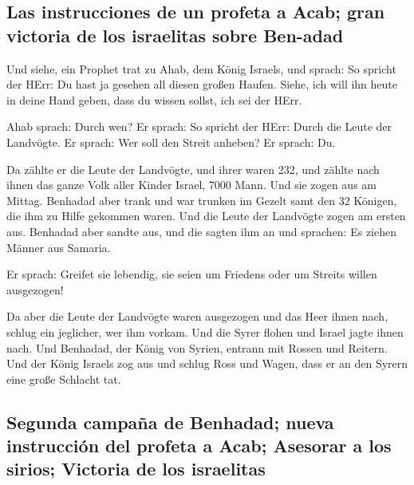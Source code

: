 \hypertarget{las-instrucciones-de-un-profeta-a-acab-gran-victoria-de-los-israelitas-sobre-ben-adad}{%
\subsection{Las instrucciones de un profeta a Acab; gran victoria de los
israelitas sobre
Ben-adad}\label{las-instrucciones-de-un-profeta-a-acab-gran-victoria-de-los-israelitas-sobre-ben-adad}}

 Und siehe, ein Prophet trat zu Ahab, dem König Israels,
und sprach: So spricht der HErr: Du hast ja gesehen all diesen großen
Haufen. Siehe, ich will ihn heute in deine Hand geben, dass du wissen
sollst, ich sei der HErr.

 Ahab sprach: Durch wen? Er sprach: So spricht der HErr:
Durch die Leute der Landvögte. Er sprach: Wer soll den Streit anheben?
Er sprach: Du.

 Da zählte er die Leute der Landvögte, und ihrer waren
232, und zählte nach ihnen das ganze Volk aller Kinder Israel, 7000
Mann.  Und sie zogen aus am Mittag. Benhadad aber trank
und war trunken im Gezelt samt den 32 Königen, die ihm zu Hilfe gekommen
waren.  Und die Leute der Landvögte zogen am ersten aus.
Benhadad aber sandte aus, und die sagten ihm an und sprachen: Es ziehen
Männer aus Samaria.

 Er sprach: Greifet sie lebendig, sie seien um Friedens
oder um Streits willen ausgezogen!

 Da aber die Leute der Landvögte waren ausgezogen und das
Heer ihnen nach,  schlug ein jeglicher, wer ihm vorkam.
Und die Syrer flohen und Israel jagte ihnen nach. Und Benhadad, der
König von Syrien, entrann mit Rossen und Reitern.  Und
der König Israels zog aus und schlug Ross und Wagen, dass er an den
Syrern eine große Schlacht tat.

\hypertarget{segunda-campauxf1a-de-benhadad-nueva-instrucciuxf3n-del-profeta-a-acab-asesorar-a-los-sirios-victoria-de-los-israelitas}{%
\subsection{Segunda campaña de Benhadad; nueva instrucción del profeta a
Acab; Asesorar a los sirios; Victoria de los
israelitas}\label{segunda-campauxf1a-de-benhadad-nueva-instrucciuxf3n-del-profeta-a-acab-asesorar-a-los-sirios-victoria-de-los-israelitas}}

